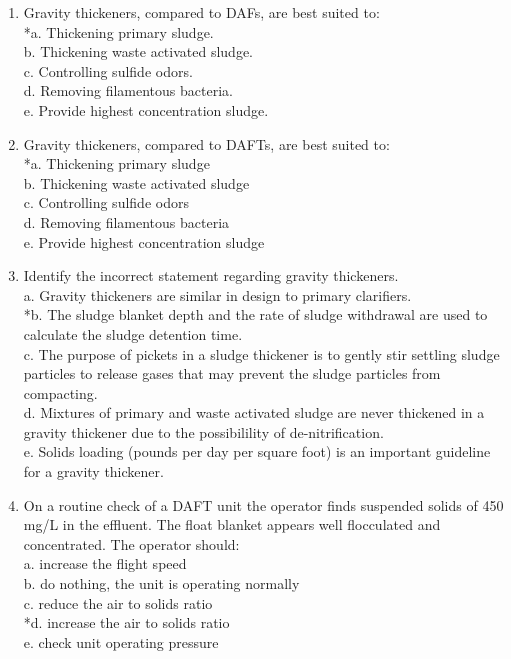 \documentclass{article}
\begin{document}
\begin{enumerate}
\item  Gravity thickeners, compared to DAFs, are best suited to: \\

*a. Thickening primary sludge. \\
b. Thickening waste activated sludge. \\
c. Controlling sulfide odors. \\
d. Removing filamentous bacteria. \\
e. Provide highest concentration sludge. \\

\item  Gravity thickeners, compared to DAFTs, are best suited to: \\

*a. Thickening primary sludge \\
b. Thickening waste activated sludge \\
c. Controlling sulfide odors \\
d. Removing filamentous bacteria \\
e. Provide highest concentration sludge \\

\item  Identify the incorrect statement regarding gravity thickeners. \\

a. Gravity thickeners are similar in design to primary clarifiers. \\
*b. The sludge blanket depth and the rate of sludge withdrawal are used to calculate the sludge detention time. \\
c. The purpose of pickets in a sludge thickener is to gently stir settling sludge particles to release gases that may prevent the sludge particles from compacting. \\
d. Mixtures of primary and waste activated sludge are never thickened in a gravity thickener due to the possibilility of de-nitrification. \\
e. Solids loading (pounds per day per square foot) is an important guideline for a gravity thickener. \\

\item  On a routine check of a DAFT unit the operator finds suspended solids of 450 mg/L in the effluent.  The float blanket appears well flocculated and concentrated. The operator should: \\

a. increase the flight speed \\
b. do nothing, the unit is operating normally \\
c. reduce the air to solids ratio \\
*d. increase the air to solids ratio \\
e. check unit operating pressure \\


\end{enumerate}
\end{document}

